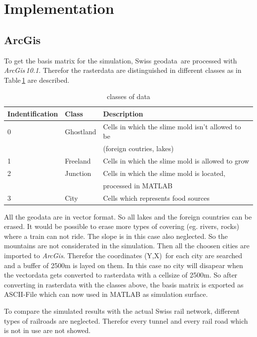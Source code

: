 \documentclass[11pt]{scrartcl}
\begin{document}
\section{Implementation}
\subsection{ArcGis}
\label{sec:arcgis}

To get the basis matrix for the simulation, Swiss geodata\,\cite{gis_data} are processed with \textit{ArcGis\,10.1}. Therefor the rasterdata are distinguished in different classes as in Table\,\ref{tab:class} are described.

\begin{table}[H]
	\centering
	\caption{classes of data}
		\begin{tabular}{lll}
		\toprule
		Indentification & Class & Description \\
		\midrule
		0 & Ghostland & Cells in which the slime mold isn't allowed to be\\
		& 		& (foreign coutries, lakes)\\
		1 & Freeland & Cells in which the slime mold is allowed to grow\\
		2 & Junction & Cells in which the slime mold is located, \\
		& & processed in MATLAB\\
		3 & City & Cells which represents food sources\\
		\bottomrule
	\end{tabular}
\label{tab:class}
\end{table}

All the geodata are in vector format. So all lakes and the foreign countries can be erased. It would be possible to erase more types of covering (eg. rivers, rocks) where a train can not ride. The slope is in this case also neglected. So the mountains are not considerated in the simulation. Then all the choosen cities are imported to \textit{ArcGis}. Therefor the coordinates (Y,X)\,\cite{coordinates} for each city are searched and a buffer of 2500m is layed on them. In this case no city will disapear when the vectordata gets converted to rasterdata with a cellsize of 2500m. So after converting in rasterdata with the classes above, the basis matrix is exported as ASCII-File which can now used in MATLAB as simulation surface.

To compare the simulated results with the actual Swiss rail network, different types of railroads are neglected. Therefor every tunnel and every rail road which is not in use are not showed.
\end{document}
